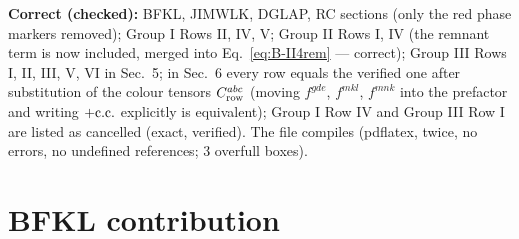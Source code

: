 \documentclass[9pt]{article}
\numberwithin{equation}{section}
\begin{document}
{\begin{enumerate}
\end{enumerate}
\textbf{Correct (checked):} BFKL, JIMWLK, DGLAP, RC sections (only the red phase markers removed); Group I Rows II, IV, V; Group II Rows I, IV (the remnant term is now included, merged into Eq.~\eqref{eq:B-II4rem} --- correct); Group III Rows I, II, III, V, VI in Sec.~5; in Sec.~6 every row equals the verified one after substitution of the colour tensors $C^{abc}_{\rm row}$ (moving $f^{gde}$, $f^{mkl}$, $f^{mnk}$ into the prefactor and writing $+{\rm c.c.}$ explicitly is equivalent); Group I Row IV and Group III Row I are listed as cancelled (exact, verified). The file compiles (pdflatex, twice, no errors, no undefined references; 3 overfull boxes).
}

\section{BFKL contribution}
\end{document}

